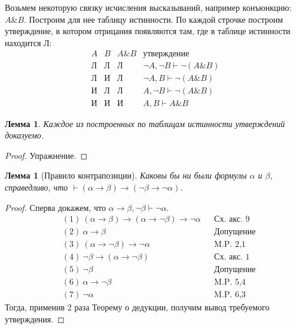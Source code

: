 \documentclass[a4paper,11pt]{article}
\newtheorem{lmm}[thm]{Лемма}
\theoremstyle{definition}
\newcommand{\proves}{\vdash}
\newcommand{\True}{\text{И}}
\newcommand{\False}{\text{Л}}
\newcommand{\amp}{\mathbin{\&}}
\begin{document}
Возьмем некоторую связку исчисления высказываний, например конъюнкцию:
$A \amp B$. Построим для нее таблицу истинности. По каждой строчке построим
утверждение, в котором отрицания появляются там, где в таблице истинности
находится $\False$:
\[
\begin{array}{cc|c|l}
A & B & A \amp B & \text{утверждение}\\\hline
\False & \False & \False & \neg A, \neg B \proves \neg(A \amp B)\\
\False & \True & \False & \neg A, B \proves \neg(A \amp B)\\
\True & \False & \False & A, \neg B \proves \neg(A \amp B)\\
\True & \True & \True & A, B \proves A \amp B
\end{array}
\]

\begin{lmm}\label{lmm:truthtable}
Каждое из построенных по таблицам истинности утверждений доказуемо.
\end{lmm}
\begin{proof}
Упражнение.
\end{proof}

\begin{lmm}[Правило контрапозиции]\label{lmm:contra}
Каковы бы ни были формулы $\alpha$ и $\beta$, справедливо, что
$\proves (\alpha \to \beta) \to (\neg\beta \to \neg\alpha)$.
\end{lmm}
\begin{proof}
Сперва докажем, что $\alpha \to \beta, \neg\beta \proves \neg\alpha$.
\begin{align*}
&(1)\ (\alpha \to \beta) \to (\alpha \to \neg\beta) \to \neg\alpha &&\text{Сх. акс. 9}\\
&(2)\ \alpha \to \beta &&\text{Допущение}\\
&(3)\ (\alpha \to \neg\beta) \to \neg\alpha &&\text{M.P. 2,1}\\
&(4)\ \neg\beta \to (\alpha \to \neg\beta) &&\text{Сх. акс. 1}\\
&(5)\ \neg\beta &&\text{Допущение}\\
&(6)\ \alpha \to \neg\beta &&\text{M.P. 5,4}\\
&(7)\ \neg\alpha &&\text{M.P. 6,3}
\end{align*}
Тогда, применив 2 раза Теорему о дедукции, получим вывод требуемого
утверждения.
\end{proof}
\end{document}
